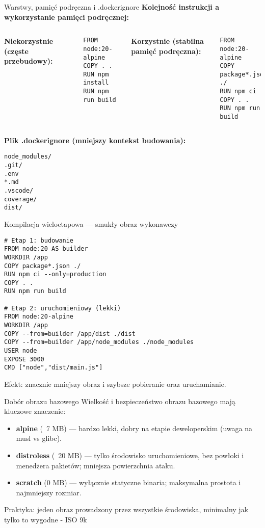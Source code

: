 \documentclass[10pt, aspectratio=169]{beamer}
\begin{document}
\begin{frame}[fragile]{Warstwy, pamięć podręczna i .dockerignore}
\textbf{Kolejność instrukcji a wykorzystanie pamięci podręcznej:}
\begin{columns}[T]
\textbf{Niekorzystnie (częste przebudowy):}
\begin{lstlisting}[language=Docker,basicstyle=\ttfamily\tiny]
FROM node:20-alpine
COPY . .
RUN npm install
RUN npm run build
\end{lstlisting}

\textbf{Korzystnie (stabilna pamięć podręczna):}
\begin{lstlisting}[language=Docker,basicstyle=\ttfamily\tiny]
FROM node:20-alpine
COPY package*.json ./
RUN npm ci
COPY . .
RUN npm run build
\end{lstlisting}
\end{columns}

\textbf{Plik .dockerignore (mniejszy kontekst budowania):}
\begin{lstlisting}[basicstyle=\ttfamily\scriptsize]
node_modules/
.git/
.env
*.md
.vscode/
coverage/
dist/
\end{lstlisting}
\end{frame}

\begin{frame}[fragile]{Kompilacja wieloetapowa — smukły obraz wykonawczy}
\begin{lstlisting}[language=Docker,basicstyle=\ttfamily\tiny]
# Etap 1: budowanie
FROM node:20 AS builder
WORKDIR /app
COPY package*.json ./
RUN npm ci --only=production
COPY . .
RUN npm run build

# Etap 2: uruchomieniowy (lekki)
FROM node:20-alpine
WORKDIR /app
COPY --from=builder /app/dist ./dist
COPY --from=builder /app/node_modules ./node_modules
USER node
EXPOSE 3000
CMD ["node","dist/main.js"]
\end{lstlisting}

Efekt: znacznie mniejszy obraz i szybsze pobieranie oraz uruchamianie.
\end{frame}

\begin{frame}{Dobór obrazu bazowego}
Wielkość i bezpieczeństwo obrazu bazowego mają kluczowe znaczenie:
\begin{itemize}
  \item \textbf{alpine} (~7 MB) — bardzo lekki, dobry na etapie deweloperskim (uwaga na musl vs glibc).
  \item \textbf{distroless} (~20 MB) — tylko środowisko uruchomieniowe, bez powłoki i menedżera pakietów; mniejsza powierzchnia ataku.
  \item \textbf{scratch} (0 MB) — wyłącznie statyczne binaria; maksymalna prostota i najmniejszy rozmiar.
\end{itemize}
Praktyka: jeden obraz prowadzony przez wszystkie środowiska, minimalny jak tylko to wygodne - ISO 9k
\end{frame}
\end{document}
